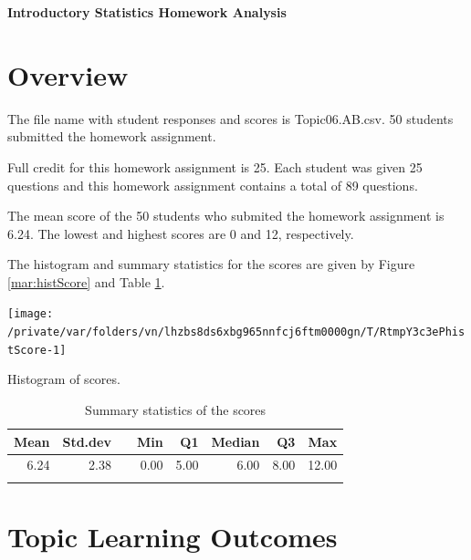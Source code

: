 \documentclass[12pt,english,nohyper]{tufte-handout}\usepackage[]{graphicx}\usepackage[]{color}
\makeatletter
\newenvironment{kframe}{%
 \def\at@end@of@kframe{}%
 \ifinner\ifhmode%
  \def\at@end@of@kframe{\end{minipage}}%
  \begin{minipage}{\columnwidth}%
 \fi\fi%
 \def\FrameCommand##1{\hskip\@totalleftmargin \hskip-\fboxsep
 \colorbox{shadecolor}{##1}\hskip-\fboxsep
     \hskip-\linewidth \hskip-\@totalleftmargin \hskip\columnwidth}%
 \MakeFramed {\advance\hsize-\width
   \@totalleftmargin\z@ \linewidth\hsize
   \@setminipage}}%
 {\par\unskip\endMakeFramed%
 \at@end@of@kframe}
\newenvironment{knitrout}{}{} %
\makeatother
\begin{document}
\setcaptionfont{
  \normalfont\footnotesize
  \color{black}
}





\centerline{\Large\bf Introductory Statistics Homework Analysis}


\section{Overview}
The file name with student responses and scores is Topic06.AB.csv. 50 students submitted the homework assignment.

Full credit for this homework assignment is 25. Each student was given 25 questions and this homework assignment contains a total of 89 questions.  

The mean score of the 50 students who submited the homework assignment is 6.24. The lowest and highest scores are 0 and 12, respectively.

The histogram and summary statistics for the scores are given by Figure \ref{mar:histScore} and Table \ref{tab:summary}.

\begin{knitrout}
\color{fgcolor}\begin{kframe}


{\ttfamily\noindent\color{warningcolor}{\#\# Warning: Removed 2 rows containing missing values (geom\_bar).}}\end{kframe}\begin{marginfigure}
\texttt{[image: /private/var/folders/vn/lhzbs8ds6xbg965nnfcj6ftm0000gn/T/RtmpY3c3ePhistScore-1]} \caption[Histogram of scores]{Histogram of scores.}\label{mar:histScore}
\end{marginfigure}


\end{knitrout}

\begin{longtable}{rrlrrrrr}
  \hline
Mean & Std.dev &   & Min & Q1 & Median & Q3 & Max \\ 
  \hline
6.24 & 2.38 &  & 0.00 & 5.00 & 6.00 & 8.00 & 12.00 \\ 
   \hline
\hline
\caption{Summary statistics of the scores} 
\label{tab:summary}
\end{longtable}


\clearpage
\newpage{}
\section{Topic Learning Outcomes}
\end{document}
